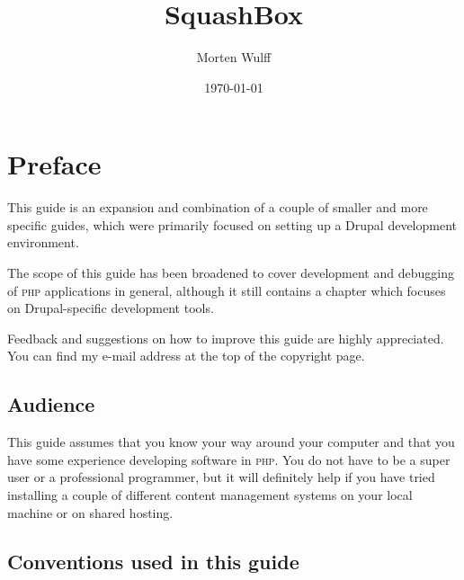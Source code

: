 \documentclass[final,ebook,10pt,twoside,openright]{memoir}
\title{SquashBox}
\author{Morten Wulff}
\date{\today}
\begin{document}
\frontmatter

\squashboxhalftitlepage{\thetitle}



\begingroup
{}
\tableofcontents*
\endgroup

\chapter{Preface} %
\label{cha:Preface}

This guide is an expansion and combination of a couple of smaller and more specific guides, which were primarily focused on setting up a Drupal development environment.

The scope of this guide has been broadened to cover development and debugging of \textsc{php} applications in general, although it still contains a chapter which focuses on Drupal-specific development tools.

Feedback and suggestions on how to improve this guide are highly appreciated. You can find my e-mail address at the top of the copyright page.


\section*{Audience}
\label{sec:Audience}

This guide assumes that you know your way around your computer and that you have some experience developing software in \textsc{php}. You do not have to be a super user or a professional programmer, but it will definitely help if you have tried installing a couple of different content management systems on your local machine or on shared hosting.


\section*{Conventions used in this guide}
\label{sec:Conventions used in this guide}
\end{document}
